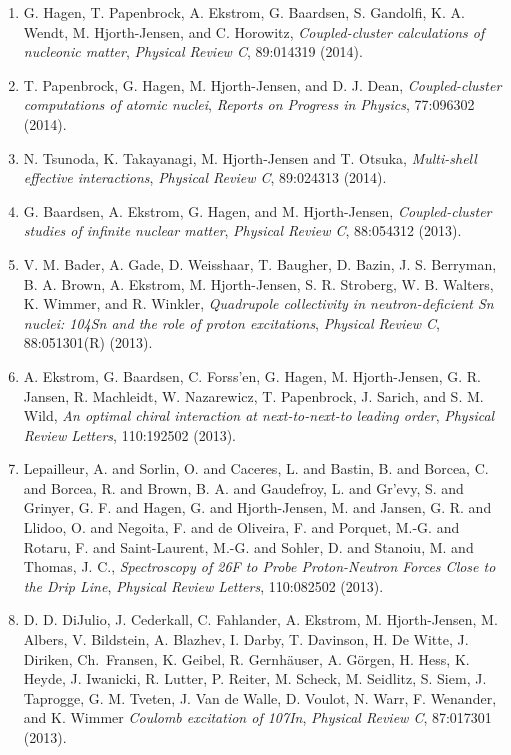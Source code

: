 \documentclass[a4wide,10pt]{article}
\begin{document}
\begin{enumerate}
\item G. Hagen, T. Papenbrock,   A. Ekstrom, G. Baardsen, S. Gandolfi, K. A. Wendt, M. Hjorth-Jensen, and C. Horowitz,  \emph{Coupled-cluster calculations of nucleonic matter},   \emph{Physical Review C},  89:014319 (2014).

\item T. Papenbrock, G. Hagen, M. Hjorth-Jensen, and  D. J. Dean,   \emph{Coupled-cluster computations of atomic nuclei},   \emph{Reports on Progress in Physics}, 77:096302 (2014).

\item N. Tsunoda, K. Takayanagi, M. Hjorth-Jensen and T. Otsuka,  \emph{Multi-shell effective interactions},   \emph{Physical Review C},    89:024313 (2014).

\item G. Baardsen, A. Ekstrom, G. Hagen, and M. Hjorth-Jensen,  \emph{Coupled-cluster studies of infinite  nuclear matter},   \emph{Physical Review C}, 88:054312 (2013).  

\item V. M. Bader, A. Gade, D. Weisshaar, T. Baugher, D. Bazin, J. S. Berryman, B. A. Brown, A. Ekstrom, M. Hjorth-Jensen, S. R. Stroberg, W. B. Walters, K. Wimmer, and R. Winkler,   \emph{Quadrupole collectivity in neutron-deficient Sn nuclei: 104Sn and the role of proton excitations},   \emph{Physical Review C},  88:051301(R) (2013). 

\item A. Ekstrom, G. Baardsen, C. Forss'en, G. Hagen, M. Hjorth-Jensen, G. R. Jansen, R. Machleidt, W. Nazarewicz, T. Papenbrock, J. Sarich, and S. M. Wild,   \emph{An optimal chiral interaction at next-to-next-to leading order},   \emph{Physical Review Letters},  110:192502 (2013).  

\item Lepailleur, A. and Sorlin, O. and Caceres, L. and Bastin, B. and Borcea, C. and Borcea, R. and Brown, B. A. and Gaudefroy, L. and Gr'evy, S. and Grinyer, G. F. and Hagen, G. and Hjorth-Jensen, M. and Jansen, G. R. and Llidoo, O. and Negoita, F. and de Oliveira, F. and Porquet, M.-G. and Rotaru, F. and Saint-Laurent, M.-G. and Sohler, D. and Stanoiu, M. and Thomas, J. C.,  \emph{Spectroscopy of 26F to Probe Proton-Neutron Forces Close to the Drip Line},   \emph{Physical Review Letters},  110:082502 (2013). 

\item D. D. DiJulio, J. Cederkall, C. Fahlander, A. Ekstrom, M. Hjorth-Jensen, M. Albers, V. Bildstein, A. Blazhev, I. Darby, T. Davinson, H. De Witte, J. Diriken, Ch.~Fransen, K. Geibel, R. Gernhäuser, A. Görgen, H. Hess, K. Heyde, J. Iwanicki, R. Lutter, P. Reiter, M. Scheck, M. Seidlitz, S. Siem, J. Taprogge, G. M. Tveten, J. Van de Walle, D. Voulot, N. Warr, F. Wenander, and K. Wimmer  \emph{Coulomb excitation of 107In},   \emph{Physical Review C},  87:017301 (2013).   


\end{enumerate}
\end{document}
